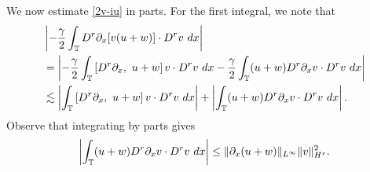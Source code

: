 We now estimate \eqref{2v-iu} in parts.
%
For the first integral, we note that 
%
%
\begin{equation}
\begin{split}
& \left |  -\frac{\gamma}{2} \int_{\mathbb{T}} D^r \partial_x [v(u+w)] \cdot
D^r v \ dx \right |
\\
& =
\left |
-\frac{\gamma}{2} \int_{\mathbb{T}} \left[ D^r \partial_x, \ u+w \right]v \cdot
D^r v \ dx - \frac{\gamma}{2} \int_{\mathbb{T}} (u+w) D^r
\partial_x v \cdot D^r v\ dx
\right | \\
& \lesssim \left |
\int_{\mathbb{T}} \left[ D^r \partial_x, \ u+w \right]v \cdot
D^r v \ dx \right |
+ \left | \int_{\mathbb{T}} (u+w) D^r \partial_x v
\cdot D^r v\
dx \right |.
\label{4v-iu}
\end{split}
\end{equation}
%
%
Observe that integrating by parts gives
%
%
\begin{equation}
\begin{split}
\left | \int_{\mathbb{T}} (u+w) D^r \partial_x v \cdot
D^r v \ dx \right |
\le \|\partial_x (u+w)\|_{L^\infty}
\|v\|_{H^r}^2.
\label{4'v-iu}
\end{split}
\end{equation}
%
%
%
%

